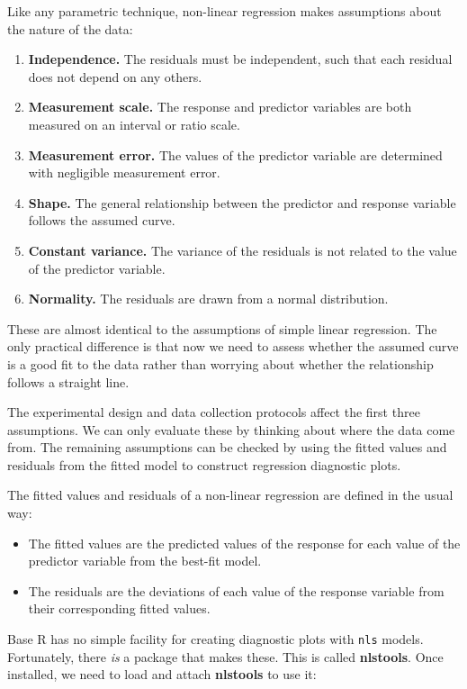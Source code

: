 \documentclass[
]{book}
\providecommand{\tightlist}{%
  \setlength{\itemsep}{0pt}\setlength{\parskip}{0pt}}
\begin{document}
Like any parametric technique, non-linear regression makes assumptions about the nature of the data:

\begin{enumerate}
\def\labelenumi{\arabic{enumi}.}
\tightlist
\item
  \textbf{Independence.} The residuals must be independent, such that each residual does not depend on any others.
\item
  \textbf{Measurement scale.} The response and predictor variables are both measured on an interval or ratio scale.
\item
  \textbf{Measurement error.} The values of the predictor variable are determined with negligible measurement error.
\item
  \textbf{Shape.} The general relationship between the predictor and response variable follows the assumed curve.
\item
  \textbf{Constant variance.} The variance of the residuals is not related to the value of the predictor variable.
\item
  \textbf{Normality.} The residuals are drawn from a normal distribution.
\end{enumerate}

These are almost identical to the assumptions of simple linear regression. The only practical difference is that now we need to assess whether the assumed curve is a good fit to the data rather than worrying about whether the relationship follows a straight line.

The experimental design and data collection protocols affect the first three assumptions. We can only evaluate these by thinking about where the data come from. The remaining assumptions can be checked by using the fitted values and residuals from the fitted model to construct regression diagnostic plots.

The fitted values and residuals of a non-linear regression are defined in the usual way:

\begin{itemize}
\tightlist
\item
  The fitted values are the predicted values of the response for each value of the predictor variable from the best-fit model.
\item
  The residuals are the deviations of each value of the response variable from their corresponding fitted values.
\end{itemize}

Base R has no simple facility for creating diagnostic plots with \texttt{nls} models. Fortunately, there \emph{is} a package that makes these. This is called \textbf{nlstools}. Once installed, we need to load and attach \textbf{nlstools} to use it:
\end{document}
